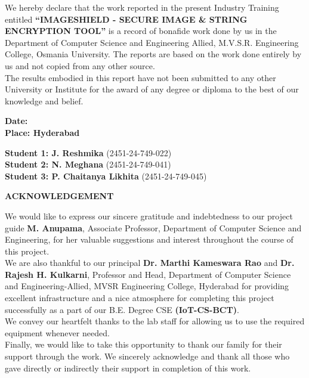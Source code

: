 \documentclass[12pt,a4paper]{report}
\begin{document}
\noindent We hereby declare that the work reported in the present Industry Training entitled \textbf{``IMAGESHIELD - SECURE IMAGE \& STRING ENCRYPTION TOOL''} is a record of bonafide work done by us in the Department of Computer Science and Engineering Allied, M.V.S.R. Engineering College, Osmania University. The reports are based on the work done entirely by us and not copied from any other source.\\[0.5cm]
\noindent The results embodied in this report have not been submitted to any other University or Institute for the award of any degree or diploma to the best of our knowledge and belief.\\[2.5cm]

\noindent
\begin{minipage}[t]{0.4\textwidth}
    \flushleft
    \textbf{Date:} \\
    \textbf{Place: Hyderabad}
\end{minipage}
\hfill
\begin{minipage}[t]{0.5\textwidth}
    \flushleft
    \textbf{Student 1: J. Reshmika} (2451-24-749-022)\\[0.2cm]
    \textbf{Student 2: N. Meghana} (2451-24-749-041)\\[0.2cm]
    \textbf{Student 3: P. Chaitanya Likhita} (2451-24-749-045)
\end{minipage}

\newpage
\begin{center}
    {\fontsize{14}{16}\selectfont \textbf{ACKNOWLEDGEMENT}}\\[1.0cm]
\end{center}

\noindent We would like to express our sincere gratitude and indebtedness to our project guide \textbf{ M. Anupama}, Associate Professor, Department of Computer Science and Engineering, for her valuable suggestions and interest throughout the course of this project.\\[0.5cm]
\noindent We are also thankful to our principal       \textbf{       Dr. Marthi Kameswara Rao} and \textbf{Dr. Rajesh H. Kulkarni}, Professor and Head, Department of Computer Science and Engineering-Allied, MVSR Engineering College, Hyderabad for providing excellent infrastructure and a nice atmosphere for completing this project successfully as a part of our B.E. Degree CSE \textbf{(IoT-CS-BCT)}.\\[0.5cm]
\noindent We convey our heartfelt thanks to the lab staff for allowing us to use the required equipment whenever needed.\\[0.5cm]
\noindent Finally, we would like to take this opportunity to thank our family for their support through the work. We sincerely acknowledge and thank all those who gave directly or indirectly their support in completion of this work.\\[1.5cm]
\end{document}
